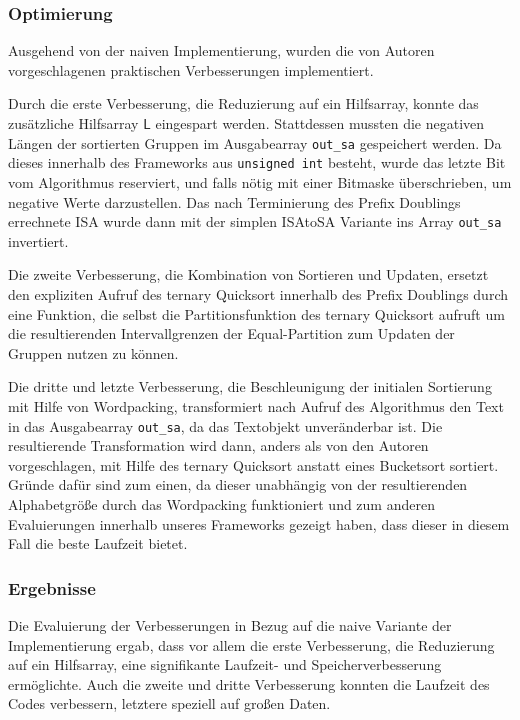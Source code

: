 \subsubsection{Optimierung}
Ausgehend von der naiven Implementierung, wurden die von Autoren vorgeschlagenen praktischen Verbesserungen implementiert. 

Durch die erste Verbesserung, die Reduzierung auf ein Hilfsarray, konnte das zusätzliche Hilfsarray $\mathsf{L}$ eingespart werden. Stattdessen mussten die negativen Längen der sortierten Gruppen im Ausgabearray \texttt{out_sa} gespeichert werden. Da dieses innerhalb des Frameworks aus \texttt{unsigned int} besteht, wurde das letzte Bit vom Algorithmus reserviert, und falls nötig mit einer Bitmaske überschrieben, um \glqq negative\grqq{} Werte darzustellen. Das nach Terminierung des Prefix Doublings errechnete ISA wurde dann mit der simplen ISAtoSA Variante ins Array \texttt{out_sa} invertiert. 

Die zweite Verbesserung, die Kombination von Sortieren und Updaten, ersetzt den expliziten Aufruf des ternary Quicksort innerhalb des Prefix Doublings durch eine Funktion, die selbst die Partitionsfunktion des ternary Quicksort aufruft um die resultierenden Intervallgrenzen der Equal-Partition zum Updaten der Gruppen nutzen zu können.

Die dritte und letzte Verbesserung, die Beschleunigung der initialen Sortierung mit Hilfe von Wordpacking, transformiert nach Aufruf des Algorithmus den Text in das Ausgabearray \texttt{out_sa}, da das Textobjekt unveränderbar ist. Die resultierende Transformation wird dann, anders als von den Autoren vorgeschlagen, mit Hilfe des ternary Quicksort anstatt eines Bucketsort sortiert. Gründe dafür sind zum einen, da dieser unabhängig von der resultierenden Alphabetgröße durch das Wordpacking funktioniert und zum anderen Evaluierungen innerhalb unseres Frameworks gezeigt haben, dass dieser in diesem Fall die beste Laufzeit bietet.
\subsubsection{Ergebnisse}
Die Evaluierung der Verbesserungen in Bezug auf die naive Variante der Implementierung ergab, dass vor allem die erste Verbesserung, die Reduzierung auf ein Hilfsarray, eine signifikante Laufzeit- und Speicherverbesserung ermöglichte.
Auch die zweite und dritte Verbesserung konnten die Laufzeit des Codes verbessern, letztere speziell auf großen Daten.

